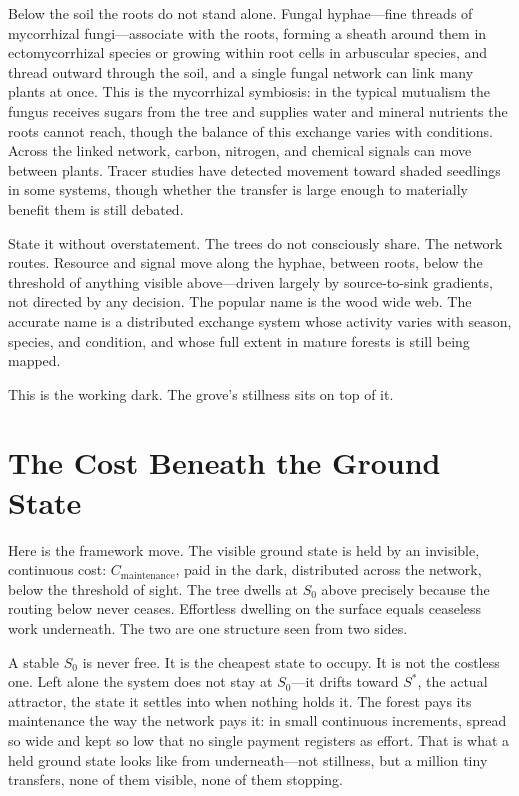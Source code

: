 \documentclass[12pt]{article}
\begin{document}
Below the soil the roots do not stand alone. Fungal hyphae---fine threads of mycorrhizal fungi---associate with the roots, forming a sheath around them in ectomycorrhizal species or growing within root cells in arbuscular species, and thread outward through the soil, and a single fungal network can link many plants at once. This is the mycorrhizal symbiosis: in the typical mutualism the fungus receives sugars from the tree and supplies water and mineral nutrients the roots cannot reach, though the balance of this exchange varies with conditions. Across the linked network, carbon, nitrogen, and chemical signals can move between plants. Tracer studies have detected movement toward shaded seedlings in some systems, though whether the transfer is large enough to materially benefit them is still debated.

State it without overstatement. The trees do not consciously share. The network routes. Resource and signal move along the hyphae, between roots, below the threshold of anything visible above---driven largely by source-to-sink gradients, not directed by any decision. The popular name is the wood wide web. The accurate name is a distributed exchange system whose activity varies with season, species, and condition, and whose full extent in mature forests is still being mapped.

This is the working dark. The grove's stillness sits on top of it.

\section{The Cost Beneath the Ground State}

Here is the framework move. The visible ground state is held by an invisible, continuous cost: $C_{\text{maintenance}}$, paid in the dark, distributed across the network, below the threshold of sight. The tree dwells at $S_0$ above precisely because the routing below never ceases. Effortless dwelling on the surface equals ceaseless work underneath. The two are one structure seen from two sides.

A stable $S_0$ is never free. It is the cheapest state to occupy. It is not the costless one. Left alone the system does not stay at $S_0$---it drifts toward $S^*$, the actual attractor, the state it settles into when nothing holds it. The forest pays its maintenance the way the network pays it: in small continuous increments, spread so wide and kept so low that no single payment registers as effort. That is what a held ground state looks like from underneath---not stillness, but a million tiny transfers, none of them visible, none of them stopping.
\end{document}
